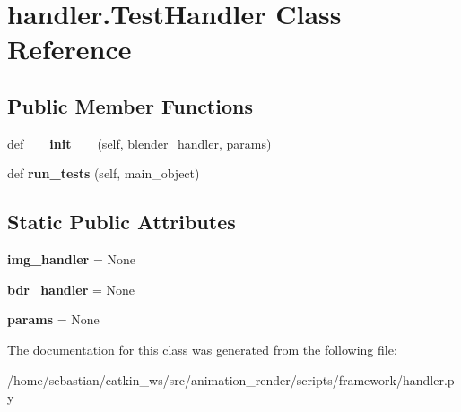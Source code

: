 \hypertarget{classhandler_1_1TestHandler}{}\section{handler.\+Test\+Handler Class Reference}
\label{classhandler_1_1TestHandler}
\subsection*{Public Member Functions}
\begin{DoxyCompactItemize}
\item 
def {\bfseries \+\_\+\+\_\+init\+\_\+\+\_\+} (self, blender\+\_\+handler, params)\hypertarget{classhandler_1_1TestHandler_a4682cf89fafdc5e1397b7d76532cf0c3}{}\label{classhandler_1_1TestHandler_a4682cf89fafdc5e1397b7d76532cf0c3}

\item 
def {\bfseries run\+\_\+tests} (self, main\+\_\+object)\hypertarget{classhandler_1_1TestHandler_a9aea5d890dca521d9fca8e4df1eee09a}{}\label{classhandler_1_1TestHandler_a9aea5d890dca521d9fca8e4df1eee09a}

\end{DoxyCompactItemize}
\subsection*{Static Public Attributes}
\begin{DoxyCompactItemize}
\item 
{\bfseries img\+\_\+handler} = None\hypertarget{classhandler_1_1TestHandler_af97d1f79ced8d8ded1e43e7efed93755}{}\label{classhandler_1_1TestHandler_af97d1f79ced8d8ded1e43e7efed93755}

\item 
{\bfseries bdr\+\_\+handler} = None\hypertarget{classhandler_1_1TestHandler_aa626582cb60f1dd06161699e1807da38}{}\label{classhandler_1_1TestHandler_aa626582cb60f1dd06161699e1807da38}

\item 
{\bfseries params} = None\hypertarget{classhandler_1_1TestHandler_aba7804872dcb014d67160fa761abd812}{}\label{classhandler_1_1TestHandler_aba7804872dcb014d67160fa761abd812}

\end{DoxyCompactItemize}


The documentation for this class was generated from the following file\+:\begin{DoxyCompactItemize}
\item 
/home/sebastian/catkin\+\_\+ws/src/animation\+\_\+render/scripts/framework/handler.\+py\end{DoxyCompactItemize}
